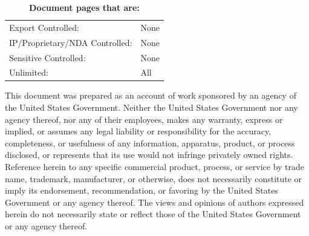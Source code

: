    \vspace*{\fill}
   
   
   \begin{table}[H]
   \caption*{\Large\bfseries{Document pages that are:}}
   \centering
   \begin{tabular}{ll}
   Export Controlled: & None \\
   IP/Proprietary/NDA Controlled: & None \\
   Sensitive Controlled: & None \\
   Unlimited: & All \\
   \end{tabular}
   \end{table}
   
   \vspace*{\fill}
   
   This document was prepared as an account of work sponsored by an agency of the United States Government. Neither the United States Government nor any agency thereof, nor any of their employees, makes any warranty, express or implied, or assumes any legal liability or responsibility for the accuracy, completeness, or usefulness of any information, apparatus, product, or process disclosed, or represents that its use would not infringe privately owned rights. Reference herein to any specific commercial product, process, or service by trade name, trademark, manufacturer, or otherwise, does not necessarily constitute or imply its endorsement, recommendation, or favoring by the United States Government or any agency thereof. The views and opinions of authors expressed herein do not necessarily state or reflect those of the United States Government or any agency thereof.

   \captionsetup{justification=justified}
   
   \vspace*{\fill}